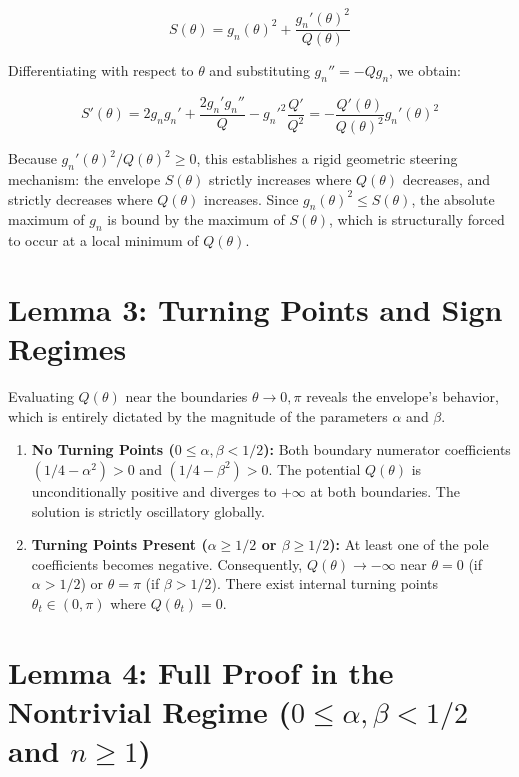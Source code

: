 \documentclass[11pt]{article}
\begin{document}
\begin{equation*}
S(\theta) = g_n(\theta)^2 + \frac{g_n'(\theta)^2}{Q(\theta)}
\end{equation*}


Differentiating with respect to \(\theta\) and substituting \(g_n'' = -Q g_n\), we obtain:


\begin{equation*}
S'(\theta) = 2g_n g_n' + \frac{2g_n'g_n''}{Q} - g_n'^2\frac{Q'}{Q^2} = - \frac{Q'(\theta)}{Q(\theta)^2} g_n'(\theta)^2
\end{equation*}


Because \(g_n'(\theta)^2 / Q(\theta)^2 \ge 0\), this establishes a rigid geometric steering mechanism: the envelope \(S(\theta)\) strictly increases where \(Q(\theta)\) decreases, and strictly decreases where \(Q(\theta)\) increases. Since \(g_n(\theta)^2 \le S(\theta)\), the absolute maximum of \(g_n\) is bound by the maximum of \(S(\theta)\), which is structurally forced to occur at a local minimum of \(Q(\theta)\).

\section*{Lemma 3: Turning Points and Sign Regimes}

Evaluating \(Q(\theta)\) near the boundaries \(\theta \to 0, \pi\) reveals the envelope's behavior, which is entirely dictated by the magnitude of the parameters \(\alpha\) and \(\beta\).

\begin{enumerate}
\item \textbf{No Turning Points (\(0 \le \alpha, \beta < 1/2\)):} Both boundary numerator coefficients \((1/4 - \alpha^2) > 0\) and \((1/4 - \beta^2) > 0\). The potential \(Q(\theta)\) is unconditionally positive and diverges to \(+\infty\) at both boundaries. The solution is strictly oscillatory globally.
\item \textbf{Turning Points Present (\(\alpha \ge 1/2\) or \(\beta \ge 1/2\)):} At least one of the pole coefficients becomes negative. Consequently, \(Q(\theta) \to -\infty\) near \(\theta=0\) (if \(\alpha > 1/2\)) or \(\theta=\pi\) (if \(\beta > 1/2\)). There exist internal turning points \(\theta_t \in (0, \pi)\) where \(Q(\theta_t) = 0\).
\end{enumerate}
\section*{Lemma 4: Full Proof in the Nontrivial Regime (\(0 \le \alpha, \beta < 1/2\) and \(n \ge 1\))}
\end{document}
